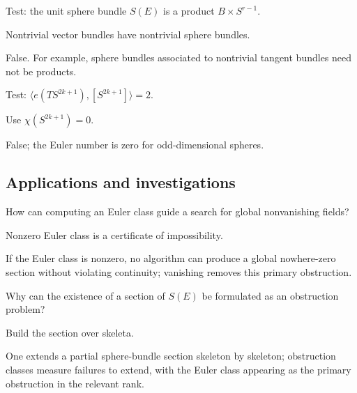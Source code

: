 \begin{exercise}\label{exr:viii32-ped-11}
Test: the unit sphere bundle $S(E)$ is a product $B\times S^{r-1}$.
\end{exercise}
\begin{hint}
Nontrivial vector bundles have nontrivial sphere bundles.
\end{hint}
\begin{solution}
False. For example, sphere bundles associated to nontrivial tangent bundles need not be products.
\end{solution}

\begin{exercise}\label{exr:viii32-ped-12}
Test: $\langle e(TS^{2k+1}),[S^{2k+1}]\rangle=2$.
\end{exercise}
\begin{hint}
Use $\chi(S^{2k+1})=0$.
\end{hint}
\begin{solution}
False; the Euler number is zero for odd-dimensional spheres.
\end{solution}

\subsection*{Applications and investigations}

\begin{exercise}\label{exr:viii32-ped-13}
How can computing an Euler class guide a search for global nonvanishing fields?
\end{exercise}
\begin{hint}
Nonzero Euler class is a certificate of impossibility.
\end{hint}
\begin{solution}
If the Euler class is nonzero, no algorithm can produce a global nowhere-zero section without violating continuity; vanishing removes this primary obstruction.
\end{solution}

\begin{exercise}\label{exr:viii32-ped-14}
Why can the existence of a section of $S(E)$ be formulated as an obstruction problem?
\end{exercise}
\begin{hint}
Build the section over skeleta.
\end{hint}
\begin{solution}
One extends a partial sphere-bundle section skeleton by skeleton; obstruction classes measure failures to extend, with the Euler class appearing as the primary obstruction in the relevant rank.
\end{solution}

